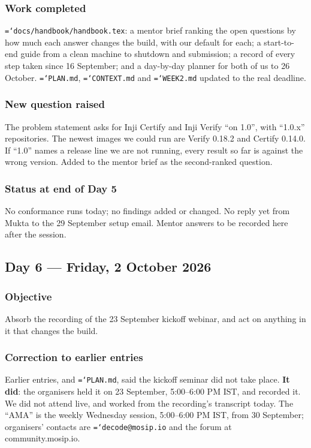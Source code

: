 \documentclass[11pt,a4paper]{article}
\let\origtexttt\texttt
\renewcommand{\texttt}[1]{\origtexttt{\hyphenchar\font=`\-\relax #1}}
\renewcommand{\_}{\textunderscore\allowbreak}
\begin{document}
\subsubsection*{Work completed}
\texttt{docs/handbook/handbook.tex}: a mentor brief ranking the open questions by how much
each answer changes the build, with our default for each; a start-to-end guide from a
clean machine to shutdown and submission; a record of every step taken since 16
September; and a day-by-day planner for both of us to 26 October. \texttt{PLAN.md},
\texttt{CONTEXT.md} and \texttt{WEEK2.md} updated to the real deadline.

\subsubsection*{New question raised}
The problem statement asks for Inji Certify and Inji Verify ``on 1.0'', with ``1.0.x''
repositories. The newest images we could run are Verify 0.18.2 and Certify 0.14.0. If ``1.0''
names a release line we are not running, every result so far is against the wrong
version. Added to the mentor brief as the second-ranked question.

\subsubsection*{Status at end of Day 5}
No conformance runs today; no findings added or changed. No reply yet from Mukta to the
29 September setup email. Mentor answers to be recorded here after the session.

\subsection{Day 6 --- Friday, 2 October 2026}

\subsubsection*{Objective}
Absorb the recording of the 23 September kickoff webinar, and act on anything in it that
changes the build.

\subsubsection*{Correction to earlier entries}
Earlier entries, and \texttt{PLAN.md}, said the kickoff seminar did not take place. \textbf{It
did}: the organisers held it on 23 September, 5:00--6:00 PM IST, and recorded it. We did not
attend live, and worked from the recording's transcript today. The ``AMA'' is the weekly
Wednesday session, 5:00--6:00 PM IST, from 30 September; organisers' contacts are
\texttt{decode@mosip.io} and the forum at community.mosip.io.
\end{document}
